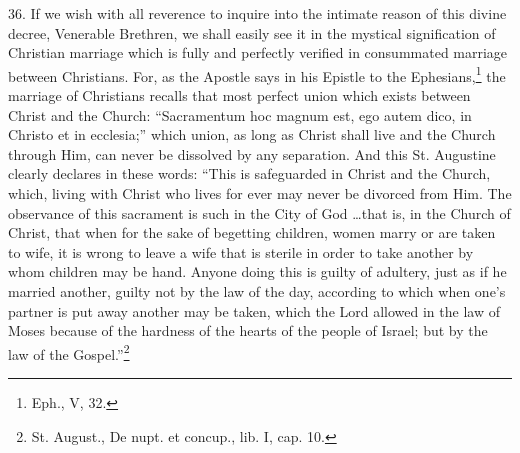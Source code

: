 \documentclass[12pt,a4paper]{book}
\begin{document}
36. If we wish with all reverence to inquire into the intimate reason of this divine decree, Venerable Brethren, we shall easily see it in the mystical signification of Christian marriage which is fully and perfectly verified in consummated marriage between Christians. For, as the Apostle says in his Epistle to the Ephesians,\footnote{Eph., V, 32.} the marriage of Christians recalls that most perfect union which exists between Christ and the Church: ``Sacramentum hoc magnum est, ego autem dico, in Christo et in ecclesia;'' which union, as long as Christ shall live and the Church through Him, can never be dissolved by any separation. And this St. Augustine clearly declares in these words: ``This is safeguarded in Christ and the Church, which, living with Christ who lives for ever may never be divorced from Him. The observance of this sacrament is such in the City of God \ldots that is, in the Church of Christ, that when for the sake of begetting children, women marry or are taken to wife, it is wrong to leave a wife that is sterile in order to take another by whom children may be hand. Anyone doing this is guilty of adultery, just as if he married another, guilty not by the law of the day, according to which when one's partner is put away another may be taken, which the Lord allowed in the law of Moses because of the hardness of the hearts of the people of Israel; but by the law of the Gospel.''\footnote{St. August., De nupt. et concup., lib. I, cap. 10.}
\end{document}
